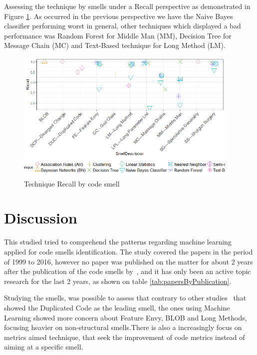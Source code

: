 Assessing the technique by smells under a Recall perspective as demonstrated in Figure \ref{fig:techniqueXSmellRecall}. As occurred in the previous perspective we have the Naive Bayes classifier performing worst in general, other techniques which displayed a bad performance was Random Forest for Middle Man (MM), Decision Tree for Message Chain (MC) and Text-Based technique for Long Method (LM).

\begin{figure}[!ht] 
    \centering
	\caption{Technique Recall by code smell}
	\label{fig:techniqueXSmellRecall}
	\includegraphics[width=0.95\textwidth]{imagens/TechniqueXSmellRecall.png}
\end{figure}

\section{Discussion}
\label{sec:discussion}

This studied tried to comprehend the patterns regarding machine learning applied for code smells identification. The study covered the papers in the period of 1999 to 2016, however no paper was published on the matter for about 2 years after the publication of the code smells by~\cite{fowler1999refactoring}, and it has only been an active topic research for the last 2 years, as shown on table \ref{tab:papersByPublication}.

Studying the smells, was possible to assess that contrary to other studies~\citep{fowler1999refactoring, rasool2015review, fernandes2016review} that showed the Duplicated Code as the leading  smell, the ones using Machine Learning showed more concern about Feature Envy, BLOB and Long Methods, focusing heavier on non-structural smells.There is also a increasingly focus on metrics aimed technique, that seek the improvement of code metrics instead of aiming at a specific smell.

